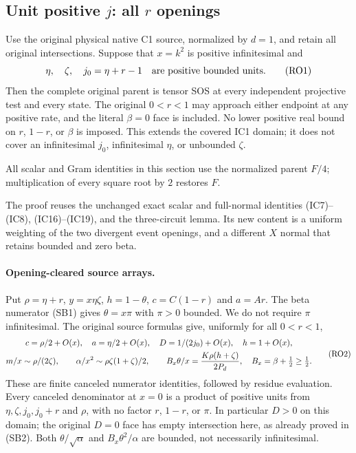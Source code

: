 \subsection{Unit positive $j$: all $r$ openings}

\label{component:p3df6e6bdd8f4}

\label{p3df6e6bdd8f4:sec:r13-c1-r-openings}

\begin{theorem}
Use the original physical native C1 source, normalized by $d=1$, and
retain all original intersections. Suppose that $x=k^2$ is positive
infinitesimal and
\[
 \eta,\quad\zeta,\quad j_0=\eta+r-1
       \quad\hbox{are positive bounded units}.                 \tag{RO1}
\]
Then the complete original parent is tensor SOS at every independent
projective test and every state. The original $0<r<1$ may approach
either endpoint at any positive rate, and the literal $\beta=0$ face
is included. No lower positive real bound on $r$, $1-r$, or $\beta$
is imposed. This extends the covered IC1 domain; it does
not cover an infinitesimal $j_0$, infinitesimal $\eta$, or unbounded
$\zeta$.
\end{theorem}

All scalar and Gram identities in this section use the normalized
parent $F/4$; multiplication of every square root by $2$ restores $F$.

The proof reuses the unchanged exact scalar and full-normal identities
(IC7)--(IC8), (IC16)--(IC19), and the three-circuit lemma. Its new
content is a uniform weighting of the two divergent event openings,
and a different $X$ normal that retains bounded and zero beta.

\paragraph{Opening-cleared source arrays.}
Put $\rho=\eta+r$, $y=x\eta\zeta$, $h=1-\theta$,
$c=C(1-r)$ and $a=Ar$. The beta numerator (SB1) gives
$\theta=x\pi$ with $\pi>0$ bounded. We do not require $\pi$
infinitesimal. The original source formulas give, uniformly for
all $0<r<1$,
\[
\begin{gathered}
 c=\rho/2+O(x),\quad a=\eta/2+O(x),\quad
 D=1/(2j_0)+O(x),\quad h=1+O(x),\\
 m/x\sim\rho/(2\zeta),\qquad
 \alpha/x^2\sim\rho\zeta(1+\zeta)/2,\qquad
 B_x\theta/x={K\rho(h+\zeta)\over2P_d},\quad
 B_x=\beta+\tfrac12\ge\tfrac12.                      
\end{gathered} \tag{RO2}
\]
These are finite canceled numerator identities, followed by residue
evaluation. Every canceled denominator at $x=0$ is a product of
positive units from $\eta,\zeta,j_0,j_0+r$ and $\rho$, with no
factor $r$, $1-r$, or $\pi$. In particular $D>0$ on this domain;
the original $D=0$ face has empty intersection here, as already proved
in (SB2). Both $\theta/\sqrt\alpha$ and
$B_x\theta^2/\alpha$ are bounded, not necessarily infinitesimal.

